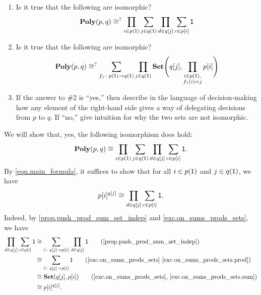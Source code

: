 \documentclass[Book-Poly]{subfiles}
\begin{document}
\begin{exercise}\label{exc.practice_sum_prod}
\begin{enumerate}
\item Is it true that the following are isomorphic?
\begin{equation}\label{eqn.poly_p_q}
  \mathbf{Poly}(p,q)
  \cong^?
  \prod_{i\in p(\textsf{1})}\sum_{j\in q(\textsf{1})}\prod_{d\in q[j]}\sum_{c\in p[i]}\textsf{1}
\end{equation}
\item Is it true that the following are isomorphic?
	\begin{equation}\label{eqn.useful_misc472}
	\mathbf{Poly}(p,q)\cong^?\sum_{f_1\colon p(\textsf{1})\to q(\textsf{1})}\prod_{j\in q(\textsf{1})}\mathbf{Set}\Bigg(q[j],\prod_{\substack{i \in p(\textsf{1}), \\ f_1(i) = j}}p[i]\Bigg)
	\end{equation}
\item If the answer to \#2 is ``yes,'' then describe in the language of decision-making how any element of the right-hand side gives a way of delegating decisions from $p$ to $q$. If ``no,'' give intuition for why the two sets are not isomorphic.
\qedhere
\end{enumerate}
\begin{solution}
\begin{longenum}
\item We will show that, yes, the following isomorphism does hold:
\[
  \mathbf{Poly}(p,q)
  \cong
  \prod_{i\in p(\textsf{1})}\sum_{j\in q(\textsf{1})}\prod_{d\in q[j]}\sum_{c\in p[i]}\textsf{1}.
\]
By \eqref{eqn.main_formula}, it suffices to show that for all $i \in p(\textsf{1})$ and $j \in q(\textsf{1})$, we have
\[
    p[i]^{q[j]} \cong \prod_{d \in q[j]} \sum_{c \in p[i]} \textsf{1}.
\]
Indeed, by \cref{prop.push_prod_sum_set_indep} and \cref{exc.on_sums_prods_sets}, we have
\begin{align*}
    \prod_{d \in q[j]} \sum_{c \in p[i]} \1 &\iso \sum_{\bar{c} \colon q[j] \to p[i]} \, \prod_{d \in q[j]} \1 \tag{\cref{prop.push_prod_sum_set_indep}} \\
    &\iso \sum_{\bar{c} \colon q[j] \to p[i]} \1 \tag{\cref{exc.on_sums_prods_sets} \cref{exc.on_sums_prods_sets.prod}} \\
    &\iso \smset(q[j], p[i]) \tag{\cref{exc.on_sums_prods_sets}, \cref{exc.on_sums_prods_sets.sum}} \\
    &\iso p[i]^{q[j]}.
\end{align*}


\end{longenum}
\end{solution}
\end{exercise}
\end{document}
